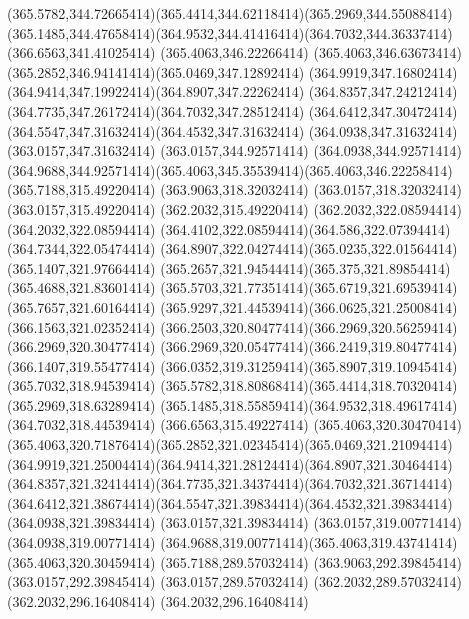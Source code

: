 {{	\curveto(365.5782,344.72665414)(365.4414,344.62118414)(365.2969,344.55088414)
	\curveto(365.1485,344.47658414)(364.9532,344.41416414)(364.7032,344.36337414)
	\lineto(366.6563,341.41025414)
	\closepath
	\moveto(365.4063,346.22266414)
	\curveto(365.4063,346.63673414)(365.2852,346.94141414)(365.0469,347.12892414)
	\curveto(364.9919,347.16802414)(364.9414,347.19922414)(364.8907,347.22262414)
	\curveto(364.8357,347.24212414)(364.7735,347.26172414)(364.7032,347.28512414)
	\curveto(364.6412,347.30472414)(364.5547,347.31632414)(364.4532,347.31632414)
	\lineto(364.0938,347.31632414)
	\lineto(363.0157,347.31632414)
	\lineto(363.0157,344.92571414)
	\lineto(364.0938,344.92571414)
	\curveto(364.9688,344.92571414)(365.4063,345.35539414)(365.4063,346.22258414)
	\closepath
	\moveto(365.7188,315.49220414)
	\lineto(363.9063,318.32032414)
	\lineto(363.0157,318.32032414)
	\lineto(363.0157,315.49220414)
	\lineto(362.2032,315.49220414)
	\lineto(362.2032,322.08594414)
	\lineto(364.2032,322.08594414)
	\curveto(364.4102,322.08594414)(364.586,322.07394414)(364.7344,322.05474414)
	\curveto(364.8907,322.04274414)(365.0235,322.01564414)(365.1407,321.97664414)
	\curveto(365.2657,321.94544414)(365.375,321.89854414)(365.4688,321.83601414)
	\curveto(365.5703,321.77351414)(365.6719,321.69539414)(365.7657,321.60164414)
	\curveto(365.9297,321.44539414)(366.0625,321.25008414)(366.1563,321.02352414)
	\curveto(366.2503,320.80477414)(366.2969,320.56259414)(366.2969,320.30477414)
	\curveto(366.2969,320.05477414)(366.2419,319.80477414)(366.1407,319.55477414)
	\curveto(366.0352,319.31259414)(365.8907,319.10945414)(365.7032,318.94539414)
	\curveto(365.5782,318.80868414)(365.4414,318.70320414)(365.2969,318.63289414)
	\curveto(365.1485,318.55859414)(364.9532,318.49617414)(364.7032,318.44539414)
	\lineto(366.6563,315.49227414)
	\closepath
	\moveto(365.4063,320.30470414)
	\curveto(365.4063,320.71876414)(365.2852,321.02345414)(365.0469,321.21094414)
	\curveto(364.9919,321.25004414)(364.9414,321.28124414)(364.8907,321.30464414)
	\curveto(364.8357,321.32414414)(364.7735,321.34374414)(364.7032,321.36714414)
	\curveto(364.6412,321.38674414)(364.5547,321.39834414)(364.4532,321.39834414)
	\lineto(364.0938,321.39834414)
	\lineto(363.0157,321.39834414)
	\lineto(363.0157,319.00771414)
	\lineto(364.0938,319.00771414)
	\curveto(364.9688,319.00771414)(365.4063,319.43741414)(365.4063,320.30459414)
	\closepath
	\moveto(365.7188,289.57032414)
	\lineto(363.9063,292.39845414)
	\lineto(363.0157,292.39845414)
	\lineto(363.0157,289.57032414)
	\lineto(362.2032,289.57032414)
	\lineto(362.2032,296.16408414)
	\lineto(364.2032,296.16408414)
}}
